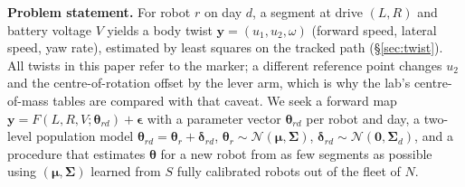 \textbf{Problem statement.} For robot \(r\) on day \(d\), a segment at
drive \((L,R)\) and battery voltage \(V\) yields a body twist
\(\mathbf y = (u_1, u_2, \omega)\) (forward speed, lateral speed, yaw
rate), estimated by least squares on the tracked path
(§\ref{sec:twist}). All twists in this paper refer to the marker; a
different reference point changes \(u_2\) and the centre-of-rotation
offset by the lever arm, which is why the lab's centre-of-mass tables
are compared with that caveat. We seek a forward map
\(\mathbf y = F(L,R,V;\boldsymbol\theta_{rd}) + \boldsymbol\epsilon\)
with a parameter vector \(\boldsymbol\theta_{rd}\) per robot and day, a
two-level population model
\(\boldsymbol\theta_{rd} = \boldsymbol\theta_r + \boldsymbol\delta_{rd}\),
\(\boldsymbol\theta_r \sim \mathcal N(\boldsymbol\mu, \boldsymbol\Sigma)\),
\(\boldsymbol\delta_{rd} \sim \mathcal N(\mathbf 0, \boldsymbol\Sigma_d)\),
and a procedure that estimates \(\boldsymbol\theta\) for a new robot
from as few segments as possible using \((\boldsymbol\mu,
\boldsymbol\Sigma)\) learned from \(S\) fully calibrated robots out of
the fleet of \(N\).

